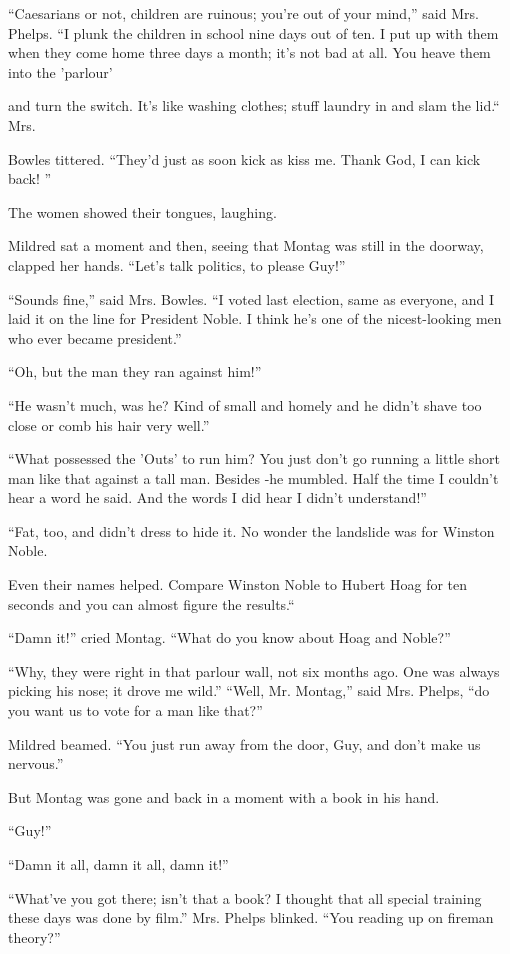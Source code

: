 \documentclass[11pt,openany]{book}
\begin{document}
``Caesarians or not, children are ruinous; you're out of your mind,'' said Mrs. Phelps. ``I plunk the children in school nine days out of ten. I put up with them when they come home three days a month; it's not bad at all. You heave them into the 'parlour'

and turn the switch. It's like washing clothes; stuff laundry in and slam the lid.`` Mrs.

Bowles tittered. ``They'd just as soon kick as kiss me. Thank God, I can kick back! ''

The women showed their tongues, laughing.

Mildred sat a moment and then, seeing that Montag was still in the doorway, clapped her hands. ``Let's talk politics, to please Guy!''

``Sounds fine,'' said Mrs. Bowles. ``I voted last election, same as everyone, and I laid it on the line for President Noble. I think he's one of the nicest-looking men who ever became president.''

``Oh, but the man they ran against him!''

``He wasn't much, was he? Kind of small and homely and he didn't shave too close or comb his hair very well.''

``What possessed the 'Outs' to run him? You just don't go running a little short man like that against a tall man. Besides -he mumbled. Half the time I couldn't hear a word he said. And the words I did hear I didn't understand!''

``Fat, too, and didn't dress to hide it. No wonder the landslide was for Winston Noble.

Even their names helped. Compare Winston Noble to Hubert Hoag for ten seconds and you can almost figure the results.``

``Damn it!'' cried Montag. ``What do you know about Hoag and Noble?''

``Why, they were right in that parlour wall, not six months ago. One was always picking his nose; it drove me wild.'' ``Well, Mr. Montag,'' said Mrs. Phelps, ``do you want us to vote for a man like that?''

Mildred beamed. ``You just run away from the door, Guy, and don't make us nervous.''

But Montag was gone and back in a moment with a book in his hand.

``Guy!''

``Damn it all, damn it all, damn it!''

``What've you got there; isn't that a book? I thought that all special training these days was done by film.'' Mrs. Phelps blinked. ``You reading up on fireman theory?''
\end{document}
